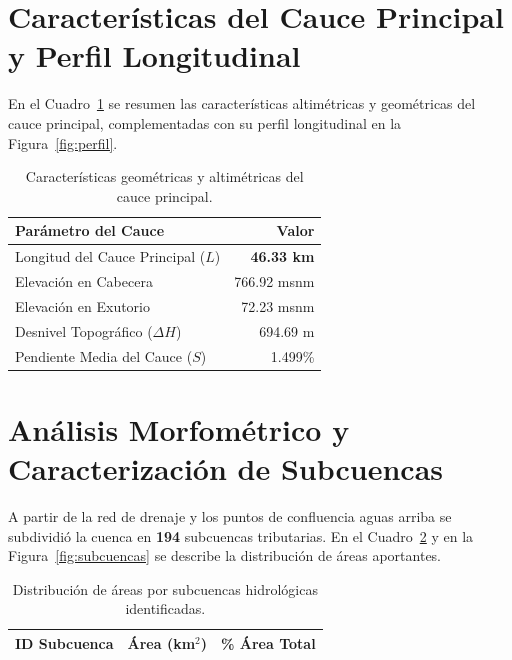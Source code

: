 \documentclass[11pt,a4paper]{article}
\begin{document}
\section{Características del Cauce Principal y Perfil Longitudinal}
En el Cuadro~\ref{tab:cauce} se resumen las características altimétricas y geométricas del cauce principal, complementadas con su perfil longitudinal en la Figura~\ref{fig:perfil}.

\begin{table}[H]
\centering
\caption{Características geométricas y altimétricas del cauce principal.}
\label{tab:cauce}
\begin{tabular}{p{8.5cm}r}\toprule
\textbf{Parámetro del Cauce} & \textbf{Valor} \\\midrule
Longitud del Cauce Principal ($L$) & \textbf{46.33 km} \\
Elevación en Cabecera & 766.92 msnm \\
Elevación en Exutorio & 72.23 msnm \\
Desnivel Topográfico ($\Delta H$) & 694.69 m \\
Pendiente Media del Cauce ($S$) & 1.499\% \\
\bottomrule
\end{tabular}
\end{table}



\section{Análisis Morfométrico y Caracterización de Subcuencas}
A partir de la red de drenaje y los puntos de confluencia aguas arriba se subdividió la cuenca en \textbf{194} subcuencas tributarias. En el Cuadro~\ref{tab:subcuencas} y en la Figura~\ref{fig:subcuencas} se describe la distribución de áreas aportantes.

\begin{table}[H]
\centering
\caption{Distribución de áreas por subcuencas hidrológicas identificadas.}
\label{tab:subcuencas}
\begin{tabular}{rrr}\toprule
\textbf{ID Subcuenca} & \textbf{Área (km$^2$)} & \textbf{\% Área Total} \\\midrule

\bottomrule
\end{tabular}
\end{table}
\end{document}
